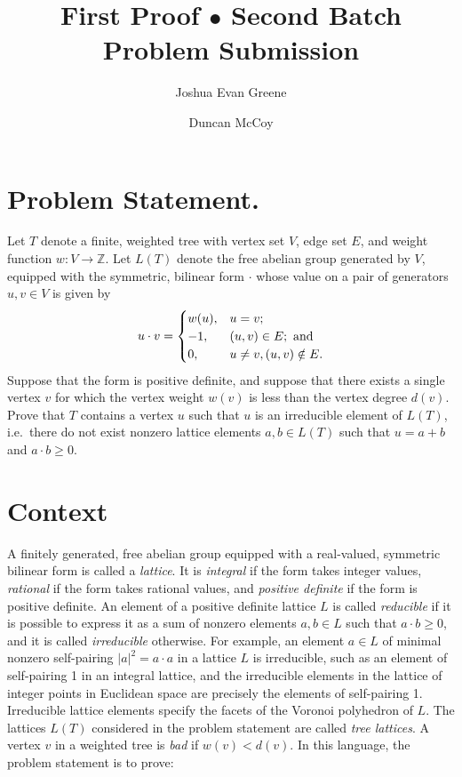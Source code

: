 \documentclass[11pt]{amsart}
\title[Problem Submission]{First Proof $\bullet$ Second Batch \\ Problem Submission}
\author{Joshua Evan Greene}
\author{Duncan McCoy}
\numberwithin{equation}{section}
\def\bZ{{\mathbb Z}}
\begin{document}
	
\maketitle

\section*{Problem Statement.}

Let $T$ denote a finite, weighted tree with vertex set $V$, edge set $E$, and weight function $w : V \longrightarrow \bZ$.
Let $L(T)$ denote the free abelian group generated by $V$, equipped with the symmetric, bilinear form $\cdot$ whose value on a pair of generators $u,v \in V$ is given by 
\[
u \cdot v = 
\begin{cases}
    w(u), & u=v; \\
    -1, & (u,v) \in E; \textup{ and} \\
    0, & u \ne v, (u,v) \notin E.
\end{cases}
\]
Suppose that the form is positive definite, and suppose that there exists a single vertex $v$ for which the vertex weight $w(v)$ is less than the vertex degree $d(v)$.
Prove that $T$ contains a vertex $u$ such that $u$ is an irreducible element of $L(T)$, i.e.~there do not exist nonzero lattice elements $a,b \in L(T)$ such that $u = a+b$ and $a \cdot b \ge 0$.


\section{Context}

A finitely generated, free abelian group equipped with a real-valued, symmetric bilinear form is called a {\em lattice}.
It is {\em integral} if the form takes integer values, {\em rational} if the form takes rational values, and {\em positive definite} if the form is positive definite.
An element of a positive definite lattice $L$ is called {\em reducible} if it is possible to express it as a sum of nonzero elements $a,b \in L$ such that $a \cdot b \ge 0$, and it is called {\em irreducible} otherwise.
For example, an element $a \in L$ of minimal nonzero self-pairing $|a|^2 = a \cdot a$ in a lattice $L$ is irreducible, such as an element of self-pairing 1 in an integral lattice, and the irreducible elements in the lattice of integer points in Euclidean space are precisely the elements of self-pairing 1.
Irreducible lattice elements specify the facets of the Voronoi polyhedron of $L$.
The lattices $L(T)$ considered in the problem statement are called {\em tree lattices}.
A vertex $v$ in a weighted tree is {\em bad} if $w(v) < d(v)$.
In this language, the problem statement is to prove:
\end{document}
